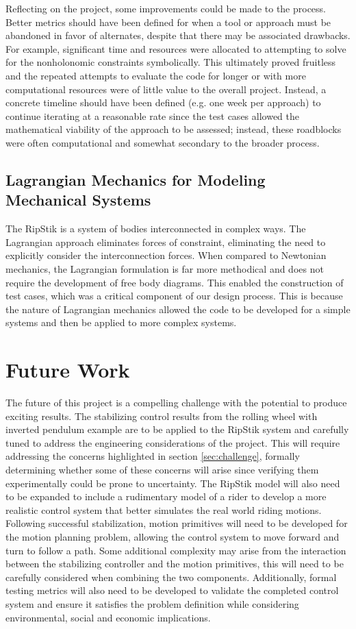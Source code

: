 Reflecting on the project, some improvements could be made to the process. 
Better metrics should have been defined for when a tool or approach must be abandoned in favor of alternates, despite that there may be associated drawbacks. 
For example, significant time and resources were allocated to attempting to solve for the nonholonomic constraints symbolically. 
This ultimately proved fruitless and the repeated attempts to evaluate the code for longer or with more computational resources were of little value to the overall project. 
Instead, a concrete timeline should have been defined (e.g. one week per approach) to continue iterating at a reasonable rate since the test cases allowed the mathematical viability of the approach to be assessed; instead, these roadblocks were often computational and somewhat secondary to the broader process.
\subsection{Lagrangian Mechanics for Modeling Mechanical Systems}
The RipStik is a system of bodies interconnected in complex ways. The Lagrangian approach eliminates forces of constraint, eliminating the need to explicitly consider the interconnection forces. When compared to Newtonian mechanics, the Lagrangian formulation is far more methodical and does not require the development of free body diagrams. This enabled the construction of test cases, which was a critical component of our design process. This is because the nature of Lagrangian mechanics allowed the code to be developed for a simple systems and then be applied to more complex systems.

\section{Future Work}
The future of this project is a compelling challenge with the potential to produce exciting results. 
The stabilizing control results from the rolling wheel with inverted pendulum example are to be applied to the RipStik system and carefully tuned to address the engineering considerations of the project.
This will require addressing the concerns highlighted in section \ref{sec:challenge}, formally determining whether some of these concerns will arise since verifying them experimentally could be prone to uncertainty.
The RipStik model will also need to be expanded to include a rudimentary model of a rider to develop a more realistic control system that better simulates the real world riding motions.
Following successful stabilization, motion primitives will need to be developed for the motion planning problem, allowing the control system to move forward and turn to follow a path.
Some additional complexity may arise from the interaction between the stabilizing controller and the motion primitives, this will need to be carefully considered when combining the two components.
Additionally, formal testing metrics will also need to be developed to validate the completed control system and ensure it satisfies the problem definition while considering environmental, social and economic implications.
